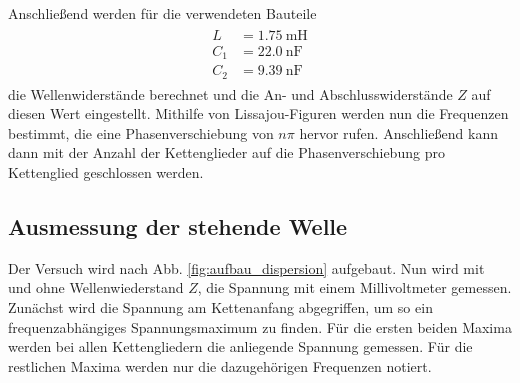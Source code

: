 Anschließend werden für die verwendeten Bauteile
\begin{align}
\begin{aligned}
  L&=\SI{1,75}{\milli\henry}\\
  C_1&=\SI{22,0}{\nano\farad}\\
  C_2&=\SI{9,39}{\nano\farad}
\end{aligned}
\end{align}
die Wellenwiderstände berechnet %
und die An- und Abschlusswiderstände $Z$ auf diesen Wert eingestellt.
Mithilfe von Lissajou-Figuren werden nun die Frequenzen bestimmt, die eine Phasenverschiebung von $n\pi$ %
hervor rufen. Anschließend kann dann mit der Anzahl der Kettenglieder auf die %
Phasenverschiebung pro Kettenglied geschlossen werden.

\subsection{Ausmessung der stehende Welle}
Der Versuch wird nach Abb. \ref{fig:aufbau_dispersion} aufgebaut.
Nun wird mit und ohne Wellenwiederstand $Z$, die Spannung mit einem Millivoltmeter gemessen. %
Zunächst wird die Spannung am Kettenanfang abgegriffen, um so ein frequenzabhängiges Spannungsmaximum
zu finden. Für die ersten beiden Maxima werden bei allen Kettengliedern die anliegende Spannung gemessen. %
Für die restlichen Maxima werden nur die dazugehörigen Frequenzen notiert.
